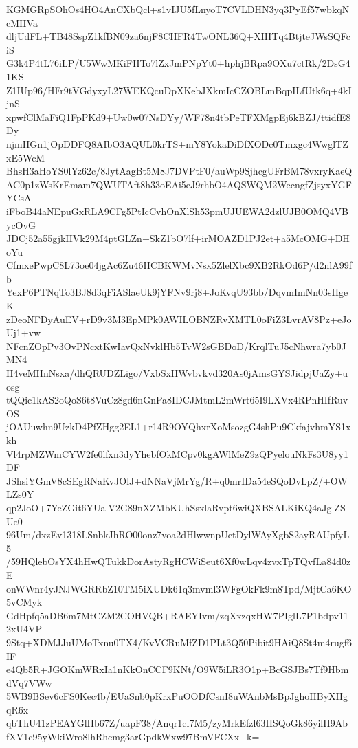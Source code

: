 KGMGRpSOhOs4HO4AnCXbQcl+s1vIJU5fLnyoT7CVLDHN3yq3PyEf57wbkqNcMHVa
dljUdFL+TB48SspZ1kfBN09za6njF8CHFR4TwONL36Q+XIHTq4BtjteJWsSQFciS
G3k4P4tL76iLP/U5WwMKiFHTo7lZxJmPNpYt0+hphjBRpa9OXu7ctRk/2DsG41KS
Z1IUp96/HFr9tVGdyxyL27WEKQcuDpXKebJXkmIcCZOBLmBqpILfUtk6q+4kIjnS
xpwfClMaFiQ1FpPKd9+Uw0w07NsDYy/WF78n4tbPeTFXMgpEj6kBZJ/ttidfE8Dy
njmHGn1jOpDDFQ8AIbO3AQUL0krTS+mY8YokaDiDfXODc0Tmxgc4WwglTZxE5WcM
BhsH3aHoYS0lYz62c/8JytAagBt5M8J7DVPtF0/auWp9SjhcgUFrBM78vxryKaeQ
AC0p1zWsKrEmam7QWUTAft8h33oEAi5eJ9rhbO4AQSWQM2WecngfZjsyxYGFYCsA
iFboB44aNEpuGxRLA9CFg5PtIcCvhOnXlSh53pmUJUEWA2dzlUJB0OMQ4VBycOvG
JDCj52a55gjkIIVk29M4ptGLZn+SkZ1bO7lf+irMOAZD1PJ2et+a5McOMG+DHoYu
CfmxePwpC8L73oe04jgAc6Zu46HCBKWMvNsx5ZlelXbc9XB2RkOd6P/d2nlA99fb
YexP6PTNqTo3BJ8d3qFiASlaeUk9jYFNv9rj8+JoKvqU93bb/DqvmImNn03sHgeK
zDeoNFDyAuEV+rD9v3M3EpMPk0AWILOBNZRvXMTL0oFiZ3LvrAV8Pz+eJoUj1+vw
NFcnZOpPv3OvPNcxtKwIavQxNvklHb5TvW2sGBDoD/KrqlTuJ5cNhwra7yb0JMN4
H4veMHnNsxa/dhQRUDZLigo/VxbSxHWvbvkvd320As0jAmsGYSJidpjUaZy+uosg
tQQic1kAS2oQoS6t8VuCz8gd6nGnPa8IDCJMtmL2mWrt65I9LXVx4RPnHIfRuvOS
jOAUuwhn9UzkD4PfZHgg2EL1+r14R9OYQhxrXoMsozgG4shPu9CkfajvhmYS1xkh
Vl4rpMZWmCYW2fe0lfxn3dyYhebfOkMCpv0kgAWlMeZ9zQPyelouNkFs3U8yy1DF
JShsiYGmV8cSEgRNaKvJOlJ+dNNaVjMrYg/R+q0mrIDa54eSQoDvLpZ/+OWLZs0Y
qp2JoO+7YeZGit6YUalV2G89nXZMbKUhSsxlaRvpt6wiQXBSALKiKQ4aJglZSUc0
96Um/dxzEv1318LSnbkJhRO00onz7voa2dHlwwnpUetDylWAyXgbS2ayRAUpfyL5
/59HQlebOsYX4hHwQTukkDorAstyRgHCWiSeut6Xf0wLqv4zvxTpTQvfLa84d0zE
onWWnr4yJNJWGRRbZ10TM5iXUDk61q3mvml3WFgOkFk9m8Tpd/MjtCa6KO5vCMyk
GdHpfq5aDB6m7MtCZM2COHVQB+RAEYIvm/zqXxzqxHW7PIglL7P1bdpv112xU4VP
9Stq+XDMJJuUMoTxnu0TX4/KvVCRuMfZD1PLt3Q50Pibit9HAiQ8St4m4rugf6IF
e4Qb5R+JGOKmWRxIa1nKkOnCCF9KNt/O9W5iLR3O1p+BcGSJBs7Tf9HbmdVq7VWw
5WB9BSev6cFS0Kec4b/EUaSnb0pKrxPuOODfCsnI8uWAnbMsBpJghoHByXHgqR6x
qbThU41zPEAYGlHb67Z/uapF38/Anqr1cl7M5/zyMrkEfzl63HSQoGk86yilH9Ab
fXV1c95yWkiWro8lhRhcmg3arGpdkWxw97BmVFCXx+k=
